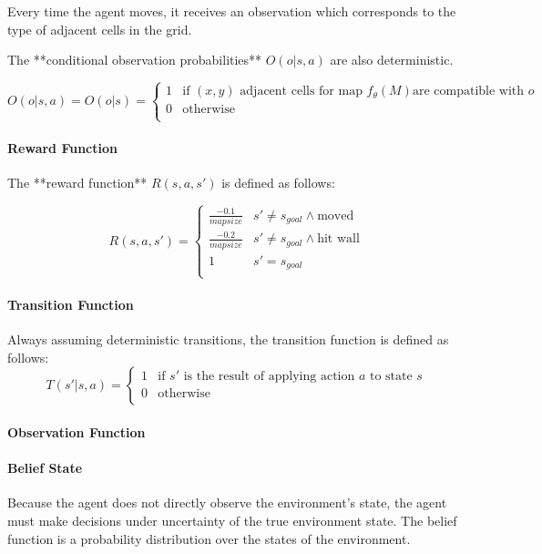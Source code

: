 Every time the agent moves, it receives an observation which corresponds to the type of adjacent cells 
in the grid.  


The **conditional observation probabilities** $O(o|s,a)$ are also deterministic.


$$O(o|s,a)= O(o|s) = 
\begin{cases}
    1 &   \text{if } (x,y) \text{ adjacent cells for map } f_\theta(M) \text{are compatible with } o \\
    0 &   \text{otherwise} \\
\end{cases}
$$

\paragraph{Reward Function}


The **reward function** $R(s,a,s')$ is defined as follows:


 $$R(s,a,s') = 
    \begin{cases}
    \frac{-0.1}{mapsize} &   s' \neq s_{goal} \wedge \text{moved} \\ 
    \frac{-0.2}{mapsize} &   s' \neq s_{goal}  \wedge \text{hit wall}\\
    1 &   s' = s_{goal} \\
    \end{cases}    
$$

\paragraph{Transition Function}
Always assuming deterministic transitions, the transition function is defined as follows:
$$T(s'|s,a) =
\begin{cases}
    1 &   \text{if } s' \text{ is the result of applying action } a \text{ to state } s \\
    0 &   \text{otherwise} \\
\end{cases}
$$

\paragraph{Observation Function}

\paragraph{Belief State}
Because the agent does not directly observe the environment's state, the agent must make decisions under uncertainty of the true environment state. The belief function is a probability distribution over the states of the environment.

